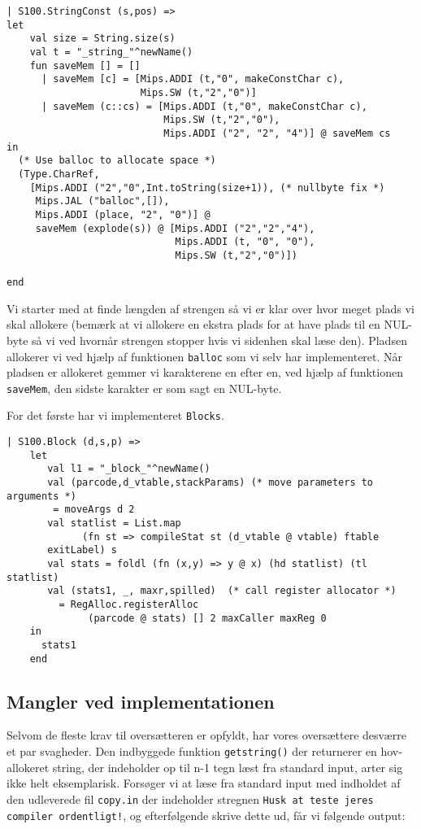 \documentclass[12pt]{article}
\begin{document}
\begin{verbatim}
| S100.StringConst (s,pos) =>
let
    val size = String.size(s)
    val t = "_string_"^newName()
    fun saveMem [] = []
      | saveMem [c] = [Mips.ADDI (t,"0", makeConstChar c),
                       Mips.SW (t,"2","0")]
      | saveMem (c::cs) = [Mips.ADDI (t,"0", makeConstChar c),
                           Mips.SW (t,"2","0"),
                           Mips.ADDI ("2", "2", "4")] @ saveMem cs
in 
  (* Use balloc to allocate space *)
  (Type.CharRef,
    [Mips.ADDI ("2","0",Int.toString(size+1)), (* nullbyte fix *)
     Mips.JAL ("balloc",[]), 
     Mips.ADDI (place, "2", "0")] @
     saveMem (explode(s)) @ [Mips.ADDI ("2","2","4"),
                             Mips.ADDI (t, "0", "0"),
                             Mips.SW (t,"2","0")])              
           
end
\end{verbatim}

Vi starter med at finde længden af strengen så vi er klar over hvor meget plads
vi skal allokere (bemærk at vi allokere en ekstra
plads for at have plads til en NUL-byte så vi ved hvornår strengen stopper hvis
vi sidenhen skal læse den). Pladsen allokerer vi ved hjælp af funktionen
\texttt{balloc} som vi selv har implementeret. Når pladsen er allokeret gemmer
vi karakterene en efter en, ved hjælp af funktionen \texttt{saveMem}, den sidste
karakter er som sagt en NUL-byte. 

For det første har vi implementeret \texttt{Blocks}. 

\begin{verbatim}
| S100.Block (d,s,p) => 
    let
       val l1 = "_block_"^newName()
       val (parcode,d_vtable,stackParams) (* move parameters to arguments *)
        = moveArgs d 2
       val statlist = List.map 
             (fn st => compileStat st (d_vtable @ vtable) ftable
       exitLabel) s
       val stats = foldl (fn (x,y) => y @ x) (hd statlist) (tl statlist)
       val (stats1, _, maxr,spilled)  (* call register allocator *)
         = RegAlloc.registerAlloc
              (parcode @ stats) [] 2 maxCaller maxReg 0
    in
      stats1
    end
\end{verbatim}


\subsection{Mangler ved implementationen}

Selvom de fleste krav til oversætteren er opfyldt, har vores oversættere
desværre et par svagheder. Den indbyggede funktion \texttt{getstring()} der returnerer en hov-allokeret string, der indeholder op til n-1 tegn læst fra standard input, arter sig ikke helt eksemplarisk. Forsøger vi at læse fra standard input med indholdet af den udleverede fil \texttt{copy.in} der indeholder stregnen \texttt{Husk at teste jeres compiler ordentligt!}, og efterfølgende skrive dette ud, får vi følgende output:\\
\end{document}
